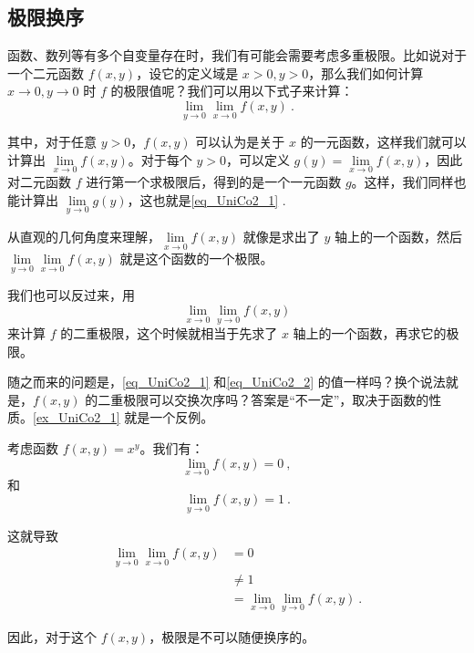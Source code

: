 

\subsection{极限换序}

函数、数列等有多个自变量存在时，我们有可能会需要考虑多重极限。比如说对于一个二元函数 $f(x, y)$，设它的定义域是 $x>0, y>0$，那么我们如何计算 $x\to 0, y\to 0$ 时 $f$ 的极限值呢？我们可以用以下式子来计算：
\begin{equation}\label{eq_UniCo2_1}
\lim\limits_{y\to 0}\lim\limits_{x\to 0}f(x, y)~.
\end{equation}

其中，对于任意 $y>0$，$f(x, y)$ 可以认为是关于 $x$ 的一元函数，这样我们就可以计算出 $\lim\limits_{x\to 0}f(x, y)$。对于每个 $y>0$，可以定义 $g(y)=\lim\limits_{x\to 0}f(x, y)$，因此对二元函数 $f$ 进行第一个求极限后，得到的是一个一元函数 $g$。这样，我们同样也能计算出 $\lim\limits_{y\to 0}g(y)$，这也就是\autoref{eq_UniCo2_1} .

从直观的几何角度来理解，$\lim\limits_{x\to 0}f(x, y)$ 就像是求出了 $y$ 轴上的一个函数，然后 $\lim\limits_{y\to 0}\lim\limits_{x\to 0}f(x, y)$ 就是这个函数的一个极限。

我们也可以反过来，用
\begin{equation}\label{eq_UniCo2_2}
\lim\limits_{x\to 0}\lim\limits_{y\to 0}f(x, y)
\end{equation}
来计算 $f$ 的二重极限，这个时候就相当于先求了 $x$ 轴上的一个函数，再求它的极限。

随之而来的问题是，\autoref{eq_UniCo2_1} 和\autoref{eq_UniCo2_2} 的值一样吗？换个说法就是，$f(x, y)$ 的二重极限可以交换次序吗？答案是“不一定”，取决于函数的性质。\autoref{ex_UniCo2_1} 就是一个反例。

\begin{example}{}\label{ex_UniCo2_1}
考虑函数 $f(x, y)=x^y$。我们有：
\begin{equation}
\lim\limits_{x\to 0}f(x, y)=0~,
\end{equation}
和
\begin{equation}
\lim\limits_{y\to 0}f(x, y)=1~.
\end{equation}

这就导致
\begin{equation}
\begin{aligned}
\lim\limits_{y\to 0}\lim\limits_{x\to 0}f(x, y)&=0\\
&\not = 1\\
&=\lim\limits_{x\to 0}\lim\limits_{y\to 0}f(x, y)~.
\end{aligned}
\end{equation}

因此，对于这个 $f(x, y)$，极限是不可以随便换序的。

\end{example}



